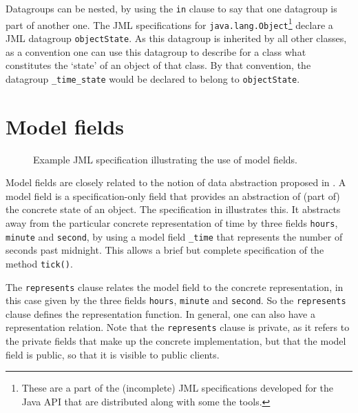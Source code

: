 \documentclass{llncs}
\begin{document}
Datagroups can be nested, by using the \texttt{in} clause to say that
one datagroup is part of another one. The JML specifications for
\texttt{java.lang.Object}\footnote{These are a part of the (incomplete) JML 
specifications developed for the Java API that are distributed along with 
some the tools.} declare a JML datagroup \texttt{objectState}. As this datagroup
is inherited by all other classes, as a convention one can use this datagroup 
to describe for a class what constitutes the `state' of an object of that class.
By that convention, the datagroup \texttt{\_time\_state} would be declared
to belong to \texttt{objectState}.

\section{Model fields}
\label{Sec:model}


\begin{figure}[tbp] 
%
%
\vspace*{-2ex} %
\caption{\label{Example:model}Example JML specification illustrating the use of model fields.}
\end{figure}


Model fields are closely related to the notion of data abstraction proposed in 
\cite{Hoare72}.  A model field is a specification-only field that provides an 
abstraction of (part of) the concrete state of an object.  
%
The specification in  illustrates this.
It abstracts away from the particular concrete representation of time
by three fields \texttt{hours}, \texttt{minute} and \texttt{second},
by using a model field \texttt{\_time} that represents the number of seconds
past midnight.
This allows a brief but complete specification of the method \texttt{tick()}.

The \texttt{represents} clause relates the model field to the concrete representation,
in this case given by the three fields  \texttt{hours}, \texttt{minute} and 
\texttt{second}. So the \texttt{represents} clause defines the 
representation function. In general, one can also have a representation relation.
Note that the \texttt{represents} clause is private, as it refers to the private
fields that make up the concrete implementation, but that the model field
is public, so that it is visible to public clients.
\end{document}
